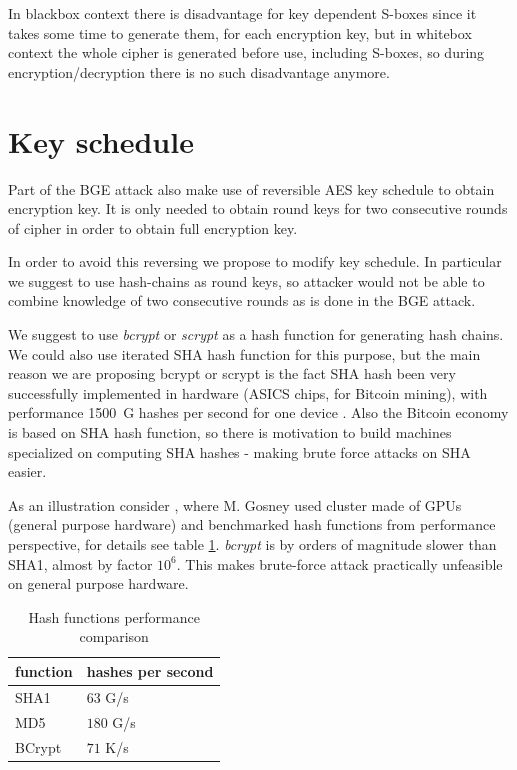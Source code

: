 \documentclass[11pt,oneside,final]{fithesis2}
\begin{document}
    In blackbox context there is disadvantage for key dependent S-boxes since it takes some time to generate them, for each encryption key, but in whitebox context
    the whole cipher is generated before use, including S-boxes, so during encryption/decryption there is no such disadvantage anymore.
   
    \section{Key schedule}
    Part of the BGE attack also make use of reversible AES key schedule to obtain encryption key. It is only needed to obtain round keys for two consecutive
    rounds of cipher in order to obtain full encryption key.

    In order to avoid this reversing we propose to modify key schedule.
    In particular we suggest to use hash-chains as round keys, so attacker would not be able to combine knowledge of two consecutive rounds as is done in the BGE attack.
    
    We suggest to use \emph{bcrypt} \citep{Provos99afuture-adaptable} or \emph{scrypt} \citep{Percival_strongerkey} as a hash function for generating hash chains. 
    We could also use iterated SHA hash function for this purpose, but the main reason we are proposing bcrypt or scrypt is the fact SHA hash been
    very successfully implemented in hardware (ASICS chips, for Bitcoin mining), with performance 1500~G hashes per second for one device \cite{shamining_web}.
    Also the Bitcoin economy is based on SHA hash function, so there is motivation to build machines specialized on computing SHA hashes - making
    brute force attacks on SHA easier.

    As an illustration consider \cite{bcrypthash}, where M. Gosney used cluster made of GPUs (general purpose hardware) and benchmarked hash functions from performance perspective, for
    details see table \ref{tbl:hash_performance}. \emph{bcrypt} is by orders of magnitude slower than SHA1, almost by factor $10^6$. This makes brute-force
    attack practically unfeasible on general purpose hardware. 

    \begin{table}
    \begin{center}
    \begin{tabular}{ l | l }
	function & hashes per second \\ \hline
	SHA1     & $63$ G/s \\ \hline
	MD5      & $180$ G/s \\ \hline
	BCrypt   & $71$ K/s \\   \hline
    \end{tabular}
    \caption{Hash functions performance comparison}
    \label{tbl:hash_performance}
    \end{center} 
    \end{table}
\end{document}
